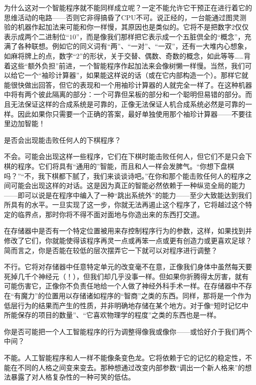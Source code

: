 \begin{description}[speculation]
为什么这对一个智能程序就不能同样成立呢？一定不能允许它干预正在进行着它的思维活动的电路——否则它非得搞昏了CPU不可。说正经的，一台能通过图灵测验的机器作起加法来可能和你一样慢，其原因也是类似的。它将不是把数字$2$仅仅表示成两个二进制位“$10$”，而是像我们那样把它表示成一个五脏倶全的“概念”，充满了各种联想。例如它的同义词有“两”、“一对”、“一双”，还有一大堆内心想象，如麻将牌上的点，数字“$2$”的形状，关于交替、偶数、奇数的概念，如此等等……背着这些“额外负担”前进，一个智能程序作起加法来会像树懒一样慢。当然，我们可以给它一个“袖珍计算器”，如果能这样说的话（或在它内部构造一个）。那样它就能很快做出回答，但它的表现和一个用袖珍计算器的人就完全一样了。在这种机器中将有两个彼此隔离的部分：一个可靠但呆板的部分和一个聪明但易错的部分。而且无法保证这样的合成系统是可靠的，正像无法保证人机合成系统必然是可靠的一样。因此如果你只需要一个正确的答案，最好单独使用那个袖珍计算器——不要往里边加智能！

\item[问题]是否会出现能击败任何人的下棋程序？
\item[推测]不会。可能会出现这样一些程序，它们在下棋时能击败任何人，但它们不是只会下棋的程序。它们将具有“通用的”智能，而且和人一样会发脾气。“你想下盘棋吗？”“不，我下棋都下腻了，我们来谈谈诗吧。”在你和那个能击败任何人的程序之间可能会出现这样的对话。这是因为真正的智能必然依赖于一种纵览全局的能力——即可以说是在程序中编入了一种“跳出系统外”的能力——至少大致能达到我们所具有的水平。一旦实现了这一步，你就无法再遏止这个程序了，它将越过这个特定的临界点，那时你将不得不面对面地与你造出来的东西打交道。

\item[问题]在存储器中是否有一个特定位置被用来存控制程序行为的参数，这样，如果找到并修改了它们，你就能使得该程序再灵一点或再笨一点或更有创造力或更喜欢足球？简而言之，你是否能在较低的层次摆弄它一下就可以对程序进行调整？
\item[推测]不行。它将对存储器中任意特定单元的改变毫不在意，正像我们身体中虽然每天要死掉几千个神经元（！），但我们却几乎没事一样。但如果你折腾得太厉害，就有可能伤害它，正像你不负责任地给一个人做了神经外科手术一样。在存储器中不存在“有魔力”的位置用以存储诸如程序的“智商”之类的东西。同样，那将是一个作为低层行为的结果而产生的性质，并非明确地存储在某个地方。对于像“短时记忆中所能保存的项目的数量”、“它喜欢物理学的程度”之类的东西也是一样。

\item[问题]你是否可能把一个人工智能程序的行为调整得像我或像你——或恰好介于我们两个中间？
\item[推测]不能。人工智能程序和人一样不能像条变色龙。它将依赖于它的记忆的稳定性，不能在不同的人格之间变来变去。那种想通过改变内部参数“调出一个新人格来”的想法暴露了对人格复杂性的一种可笑的低估。


\end{description}
